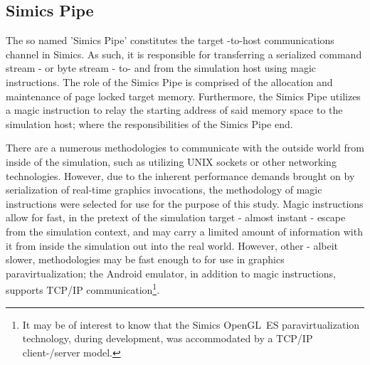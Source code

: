 \subsection{Simics Pipe}
\label{sec:proposedsolutionandimplementation_simicspipe}
The so named 'Simics Pipe' constitutes the target -to-host communications channel in Simics.
As such, it is responsible for transferring a serialized command stream - or byte stream - to- and from the simulation host using magic instructions.
The role of the Simics Pipe is comprised of the allocation and maintenance of page locked target memory.
Furthermore, the Simics Pipe utilizes a magic instruction to relay the starting address of said memory space to the simulation host; where the responsibilities of the Simics Pipe end.

There are a numerous methodologies to communicate with the outside world from inside of the simulation, such as utilizing UNIX sockets or other networking technologies.
However, due to the inherent performance demands brought on by serialization of real-time graphics invocations, the methodology of magic instructions were selected for use for the purpose of this study.
Magic instructions allow for fast, in the pretext of the simulation target - almost instant - escape from the simulation context, and may carry a limited amount of information with it from inside the simulation out into the real world.
However, other - albeit slower, methodologies may be fast enough to for use in graphics paravirtualization; the Android emulator, in addition to magic instructions, supports TCP/IP communication\footnote{It may be of interest to know that the Simics OpenGL~ES paravirtualization technology, during development, was accommodated by a TCP/IP client-/server model.}.

